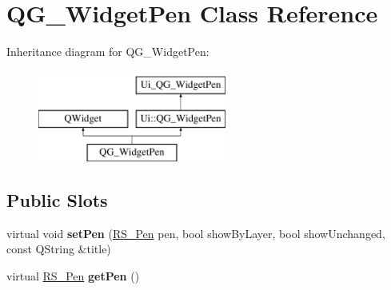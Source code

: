 \hypertarget{classQG__WidgetPen}{\section{Q\-G\-\_\-\-Widget\-Pen Class Reference}
\label{classQG__WidgetPen}
}
Inheritance diagram for Q\-G\-\_\-\-Widget\-Pen\-:\begin{figure}[H]
\begin{center}
\leavevmode
\includegraphics[height=3.000000cm]{classQG__WidgetPen}
\end{center}
\end{figure}
\subsection*{Public Slots}
\begin{DoxyCompactItemize}
\item 
\hypertarget{classQG__WidgetPen_aae1ed58d529ef69df77d1d82cdc7c43f}{virtual void {\bfseries set\-Pen} (\hyperlink{classRS__Pen}{R\-S\-\_\-\-Pen} pen, bool show\-By\-Layer, bool show\-Unchanged, const Q\-String \&title)}\label{classQG__WidgetPen_aae1ed58d529ef69df77d1d82cdc7c43f}

\item 
\hypertarget{classQG__WidgetPen_a80d38610b5ecb275648f4ce2841f2979}{virtual \hyperlink{classRS__Pen}{R\-S\-\_\-\-Pen} {\bfseries get\-Pen} ()}\label{classQG__WidgetPen_a80d38610b5ecb275648f4ce2841f2979}

\end{DoxyCompactItemize}
